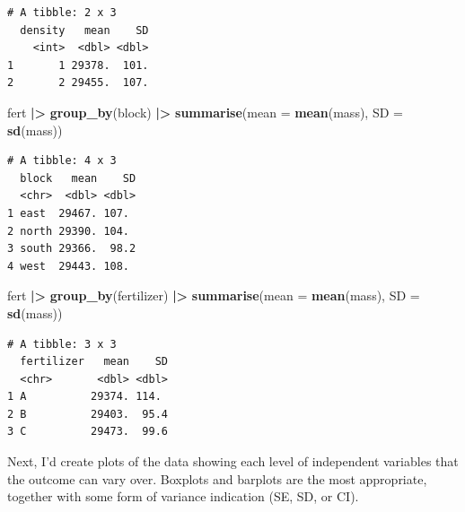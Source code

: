 \documentclass[
  10t,
]{article}
\newenvironment{Shaded}{\begin{snugshade}}{\end{snugshade}}
\newcommand{\AttributeTok}[1]{\textcolor[rgb]{0.13,0.29,0.53}{#1}}
\newcommand{\FunctionTok}[1]{\textcolor[rgb]{0.13,0.29,0.53}{\textbf{#1}}}
\newcommand{\NormalTok}[1]{#1}
\newcommand{\SpecialCharTok}[1]{\textcolor[rgb]{0.81,0.36,0.00}{\textbf{#1}}}
\begin{document}
\begin{verbatim}
# A tibble: 2 x 3
  density   mean    SD
    <int>  <dbl> <dbl>
1       1 29378.  101.
2       2 29455.  107.
\end{verbatim}

\begin{Shaded}
\begin{Highlighting}[]
\NormalTok{fert }\SpecialCharTok{|\textgreater{}} 
  \FunctionTok{group\_by}\NormalTok{(block) }\SpecialCharTok{|\textgreater{}} 
  \FunctionTok{summarise}\NormalTok{(}\AttributeTok{mean =} \FunctionTok{mean}\NormalTok{(mass),}
            \AttributeTok{SD =} \FunctionTok{sd}\NormalTok{(mass))}
\end{Highlighting}
\end{Shaded}

\begin{verbatim}
# A tibble: 4 x 3
  block   mean    SD
  <chr>  <dbl> <dbl>
1 east  29467. 107. 
2 north 29390. 104. 
3 south 29366.  98.2
4 west  29443. 108. 
\end{verbatim}

\begin{Shaded}
\begin{Highlighting}[]
\NormalTok{fert }\SpecialCharTok{|\textgreater{}} 
  \FunctionTok{group\_by}\NormalTok{(fertilizer) }\SpecialCharTok{|\textgreater{}} 
  \FunctionTok{summarise}\NormalTok{(}\AttributeTok{mean =} \FunctionTok{mean}\NormalTok{(mass),}
            \AttributeTok{SD =} \FunctionTok{sd}\NormalTok{(mass))}
\end{Highlighting}
\end{Shaded}

\begin{verbatim}
# A tibble: 3 x 3
  fertilizer   mean    SD
  <chr>       <dbl> <dbl>
1 A          29374. 114. 
2 B          29403.  95.4
3 C          29473.  99.6
\end{verbatim}

Next, I'd create plots of the data showing each level of independent
variables that the outcome can vary over. Boxplots and barplots are the
most appropriate, together with some form of variance indication (SE,
SD, or CI).
\end{document}
